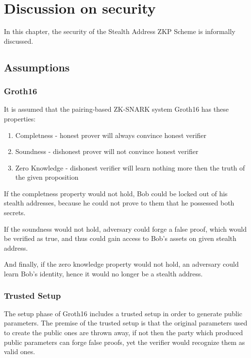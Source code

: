 \chapter{Discussion on security}\label{chapter:security}

In this chapter, the security of the Stealth Address ZKP Scheme is informally discussed.

\section{Assumptions}

\subsection{Groth16}

It is assumed that the pairing-based ZK-SNARK system Groth16\cite{Groth16} has these properties:
\begin{enumerate}
    \item Completness - honest prover will always convince honest verifier
    \item Soundness - dishonest prover will not convince honest verifier
    \item Zero Knowledge - dishonest verifier will learn nothing more then the truth of the given proposition
\end{enumerate}

If the completness property would not hold, Bob could be locked out of his stealth
addresses, because he could not prove to them that he possessed both secrets.

If the soundness would not hold, adversary could forge a false proof, which
would be verified as true, and thus could gain access to Bob's assets on given
stealth address.

And finally, if the zero knowledge property would not hold, an adversary could
learn Bob's identity, hence it would no longer be a stealth address.

\subsection{Trusted Setup}

The setup phase of Groth16\cite{Groth16} includes a trusted setup in order to generate
public parameters. The premise of the trusted setup is that the original parameters
used to create the public ones are thrown away, if not then the party which
produced public parameters can forge false proofs, yet the verifier would
recognize them as valid ones.

